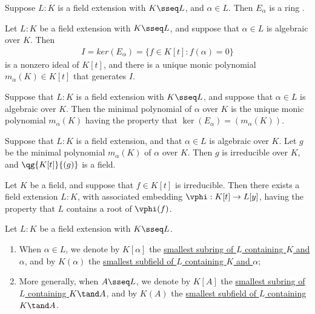 \documentclass{article}
\begin{document}
  \begin{tproposition}
    Suppose \( L: K \) is a field extension with \( K \sseq L \), and \( \alpha\in L \).
     Then \( E_\alpha \) is a ring \homo.
  \end{tproposition}

  \begin{tproposition}
    Let \( L : K \) be a field extension with \( K \sseq L \), and suppose that \( \alpha\in L \) is algebraic over \( K \).
    Then \begin{align*}
      I = ker(E_\alpha) = \{f \in K[t] : f(\alpha) = 0\}
    \end{align*}
    is a nonzero ideal of \( K[t] \), and there is a unique monic polynomial \( m_\alpha(K) \in K[t] \) that generates \( I \).
  \end{tproposition}

  \begin{tdefinition}
    Suppose that \( L : K \) is a field extension with \( K \sseq L \), and suppose that \( \alpha\in L \) is algebraic over \( K \).
    Then the minimal polynomial of \( \alpha \) over \( K \) is the unique monic polynomial \( m_\alpha(K) \) having the property that \( \ker(E_\alpha) = (m_\alpha(K)) \).
  \end{tdefinition}

  \begin{ttheorem}
    Suppose that \( L : K \) is a field extension, and that \( \alpha\in L \) is algebraic over \( K \).
    Let \( g \) be the minimal polynomial \( m_\alpha(K) \) of \( \alpha \) over \( K \).
    Then \( g \) is irreducible over \( K \), and \( \qg{K[t]}{(g)} \) is a field.
  \end{ttheorem}

  \begin{ttheorem}
    Let \( K \) be a field, and suppose that \( f\in K[t] \) is irreducible.
    Then there exists a field extension \( L:K \), with associated embedding \( \vphi:K[t]\to L[y] \), having the property that \( L \) contains a root of \( \vphi(f) \).
  \end{ttheorem}

  \begin{tdefinition}
    Let \( L:K \) be a field extension with \( K\sseq L \).
    \begin{enumerate}[label=(\roman*)]
      \item When \( \alpha\in L \), we denote by \( K[\alpha] \) the \ul{smallest subring of \( L \) containing \( K \) and \( \alpha \)}, and by \( K(\alpha) \) the \ul{smallest subfield of \( L \) containing \( K \) and \( \alpha \)};
      \item More generally, when \( A\sseq L \), we denote by \( K[A] \) the \ul{smallest subring of \( L \) containing \( K \tand A \)}, and by \( K(A) \) the \ul{smallest subfield of \( L \) containing \( K \tand A \)}.
    \end{enumerate}
  \end{tdefinition}
\end{document}
